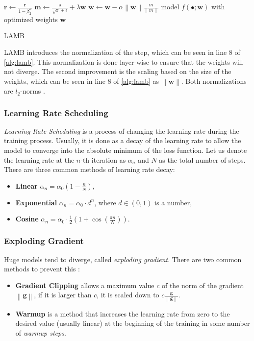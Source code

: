 \begin{description}
\begin{algorithm}
\begin{algorithmic}[1]
            \State $\pmb{r} \gets \frac{\pmb{r}}{1 - \beta_2^n}$
            \State $\pmb{m} \gets \frac{\pmb{s}}{\sqrt{\pmb{r}} + \epsilon} + \lambda \pmb{w}$
            \State $\pmb{w} \gets \pmb{w} - \alpha  \left\lVert \pmb{w} \right\rVert  \frac{m}{\left\lVert m \right\rVert}$
        \EndFor
        \Ensure model $f(\bullet;\pmb{w})$ with optimized weights $\pmb{w}$
        \end{algorithmic}
        \caption{LAMB}
        \label{alg:lamb}
    \end{algorithm}
    LAMB introduces the normalization of the step, which can be seen in line 8 of \cref{alg:lamb}.
    This normalization is done layer-wise to ensure that the weights will not diverge.
    The second improvement is the scaling based on the size of the weights, which can be seen in line 8 of \cref{alg:lamb} as $\left\lVert \pmb{w} \right\rVert$.
    Both normalizations are $l_2$-norms \cite{lamb}.
\end{description}

\subsubsection*{Learning Rate Scheduling}
\emph{Learning Rate Scheduling} is a process of changing the learning rate during the training process.
Usually, it is done as a decay of the learning rate to allow the model to converge into the absolute minimum of the loss function.
Let us denote the learning rate at the $n$-th iteration as $\alpha_n$ and $N$ as the total number of steps.
There are three common methods of learning rate decay: 
\begin{itemize}
    \item \textbf{Linear} $\alpha_n = \alpha_0\left(1-\frac{n}{N}\right)$,
    \item \textbf{Exponential} $\alpha_n = \alpha_0\cdot d^n$, where $d \in (0,1)$ is a number,
    \item \textbf{Cosine} $\alpha_n = \alpha_0\cdot\frac12\left(1+\cos\left(\frac{\pi n}{N}\right)\right)$.
\end{itemize}
\subsubsection*{Exploding Gradient}
Huge models tend to diverge, called \emph{exploding gradient}.
There are two common methods to prevent this \cite{deeplearningbook}:
\begin{itemize}
    \item \textbf{Gradient Clipping} allows a maximum value $c$ of the norm of the gradient $\left\lVert \pmb{g} \right\rVert$, if it is larger than $c$, it is scaled down to $c \frac{\pmb{g}}{\left\lVert \pmb{g} \right\rVert}$.
    \item \textbf{Warmup} is a method that increases the learning rate from zero to the desired value (usually linear) at the beginning of the training in some number of \emph{warmup steps}.
\end{itemize}

